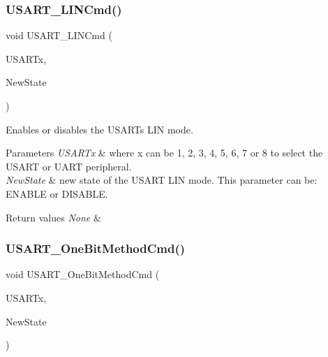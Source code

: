 \subsubsection{\texorpdfstring{U\+S\+A\+R\+T\+\_\+\+L\+I\+N\+Cmd()}{USART\_LINCmd()}}
{\footnotesize\ttfamily void U\+S\+A\+R\+T\+\_\+\+L\+I\+N\+Cmd (\begin{DoxyParamCaption}\item[{U\+S\+A\+R\+T\+\_\+\+Type\+Def $\ast$}]{U\+S\+A\+R\+Tx,  }\item[{Functional\+State}]{New\+State }\end{DoxyParamCaption})}



Enables or disables the U\+S\+A\+RT\textquotesingle{}s L\+IN mode. 


\begin{DoxyParams}{Parameters}
{\em U\+S\+A\+R\+Tx} & where x can be 1, 2, 3, 4, 5, 6, 7 or 8 to select the U\+S\+A\+RT or U\+A\+RT peripheral. \\
\hline
{\em New\+State} & new state of the U\+S\+A\+RT L\+IN mode. This parameter can be\+: E\+N\+A\+B\+LE or D\+I\+S\+A\+B\+LE. \\
\hline
\end{DoxyParams}

\begin{DoxyRetVals}{Return values}
{\em None} & \\
\hline
\end{DoxyRetVals}
\mbox{\label{group___u_s_a_r_t_ga3ed89ea8765d851510cfe90f7d90cbbb}} 
\subsubsection{\texorpdfstring{U\+S\+A\+R\+T\+\_\+\+One\+Bit\+Method\+Cmd()}{USART\_OneBitMethodCmd()}}
{\footnotesize\ttfamily void U\+S\+A\+R\+T\+\_\+\+One\+Bit\+Method\+Cmd (\begin{DoxyParamCaption}\item[{U\+S\+A\+R\+T\+\_\+\+Type\+Def $\ast$}]{U\+S\+A\+R\+Tx,  }\item[{Functional\+State}]{New\+State }\end{DoxyParamCaption})}



